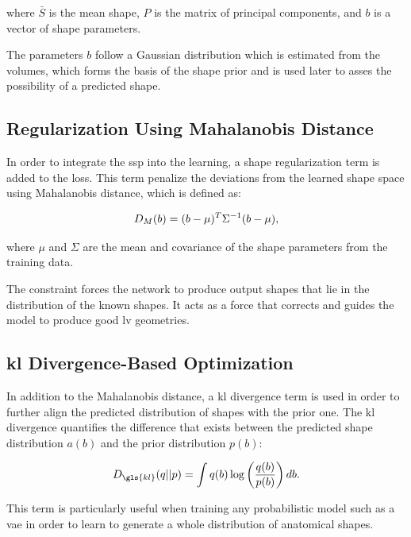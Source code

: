 where $\bar{S}$ is the mean shape, $P$ is the matrix of principal components, and $b$ is a vector of shape parameters.

The parameters $b$ follow a Gaussian distribution which is estimated from the volumes, which forms the basis of the shape prior and is used later to asses the possibility of a predicted shape.

\subsection{Regularization Using Mahalanobis Distance}
In order to integrate the \gls{ssp} into the learning, a shape regularization term is added to the loss. This term penalize the deviations from the learned shape space using Mahalanobis distance, which is defined as:

\begin{equation} 
\addcontentsline{equ}{equations}{\protect\numberline{\theequation}Mahalanobis Distance}
D_M(b) = (b - \mu)^T \Sigma^{-1} (b - \mu), 
\end{equation}

where $\mu$ and $\Sigma$ are the mean and covariance of the shape parameters from the training data.

The constraint forces the network to produce output shapes that lie in the distribution of the known shapes. It acts as a force that corrects and guides the model to produce good \gls{lv} geometries.

\subsection{\gls{kl} Divergence-Based Optimization}
In addition to the Mahalanobis distance, a \gls{kl} divergence term is used in order to further align the predicted distribution of shapes with the prior one. The \gls{kl} divergence quantifies the difference that exists between the predicted shape distribution $a(b)$ and the prior distribution $p(b)$:

\begin{equation} 
\addcontentsline{equ}{equations}{\protect\numberline{\theequation}\gls{kl} Divergence}
D_{\gls{kl}}(q || p) = \int q(b) \log \left(\frac{q(b)}{p(b)}\right) db. 
\end{equation}

This term is particularly useful when training any probabilistic model such as a \gls{vae} in order to learn to generate a whole distribution of anatomical shapes.


